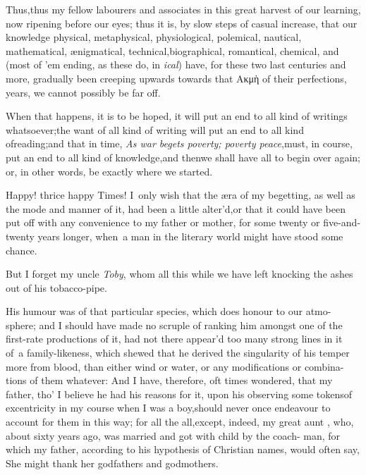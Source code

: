 \documentclass{article}
\begin{document}
Thus,\tsk thus my fellow labourers and associates in this great harvest of
our learning, now ripening before our eyes; thus it is, by slow steps of casual
increase, that our knowledge physical, metaphy\-sical, physiological, polemical,
nautical, mathematical, ænigmatical, technical,\break biographical, romantical,
chemical, and 
\break
(most of ’em ending, as these do, in \textit{ical}) have, for these two last
centuries and more, gradually been creeping upwards towards that Ακμὴ of their
perfections,\break 
{} 
years, we cannot possibly be far off.

When that happens, it is to be hoped, it will put an end to all
kind of writings whatsoever;\tsk the want of all kind of writing
will put an end to all kind of\break reading;\tsk and that in time,
\textit{As war be\-gets poverty; poverty peace},\tsh must, in
course, put an end to all kind of know\-ledge,\tsk and
then\tsh we shall have all to begin over again; or, in
other words, be exactly where we started.

\tsh Happy! thrice happy Times! I~only wish that the æra of my begetting, as well
as the mode and manner of it, had been a little alter’d,\tsk or that it could have
been put off with any convenience to my father or mother, for some twenty or
five-and-twenty years longer, when~a man in the literary world might have\break
stood some chance.\tsh 

But I forget my uncle \textit{Toby}, whom all\break
this while we have left knocking the\break
ashes out of his tobacco-pipe.

His humour was of that particular\break
species, which does honour to our atmo-
sphere; and I should have made no scruple of ranking him
amongst one of the first-rate productions of it, had not there
appear’d too many strong lines in it of~a family-likeness, which
shewed that he derived the singularity of his temper\break
more from blood, than either wind or\break 
water, or any modifications or combina-\break
tions of them whatever: And I have, therefore, oft times
wondered, that my father, tho’ I believe he had his reasons
for it, upon his observing some tokens\break of excentricity in my
course when I was a boy,\tsk should never once endeavour to
account for them in this way; for all the\break
{}
all,\tsk except, indeed, my great aunt , 
who, about sixty years ago, was 
married and got with child by the coach- 
man, for which my father, according to his hypothesis of Christian
names, would often say, She might thank her godfathers and
godmothers.
\end{document}
